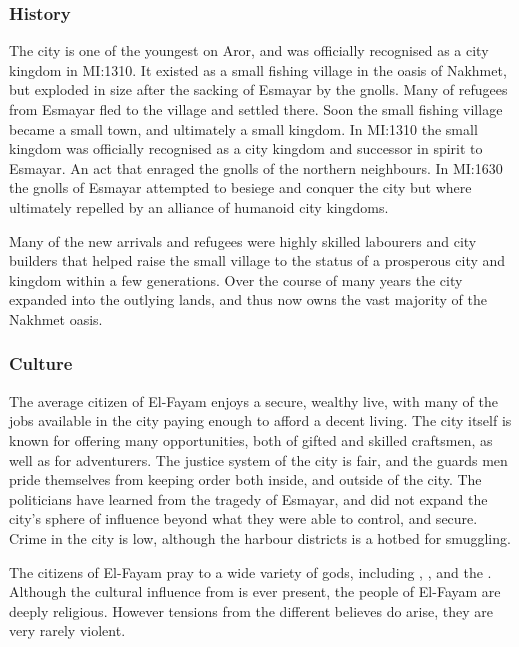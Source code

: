 \subsubsection{History}

The city is one of the youngest on Aror, and was officially recognised as a
city kingdom in MI:1310. It existed as a small fishing village in the oasis of
Nakhmet, but exploded in size after the sacking of Esmayar by the gnolls. Many
of refugees from Esmayar fled to the village and settled there. Soon the small
fishing village became a small town, and ultimately a small kingdom. In
MI:1310 the small kingdom was officially recognised as a city kingdom and
successor in spirit to Esmayar. An act that enraged the gnolls of the northern
neighbours. In MI:1630 the gnolls of Esmayar attempted to besiege and conquer
the city but where ultimately repelled by an alliance of humanoid city
kingdoms.

Many of the new arrivals and refugees were highly skilled labourers and city
builders that helped raise the small village to the status of a prosperous
city and kingdom within a few generations. Over the course of many years the
city expanded into the outlying lands, and thus now owns the vast majority of
the Nakhmet oasis.

\subsubsection{Culture}

The average citizen of El-Fayam enjoys a secure, wealthy live, with many of
the jobs available in the city paying enough to afford a decent living. The
city itself is known for offering many opportunities, both of gifted and skilled
craftsmen, as well as for adventurers. The justice system of the city is fair,
and the guards men pride themselves from keeping order both inside, and outside
of the city. The politicians have learned from the tragedy of Esmayar, and did
not expand the city's sphere of influence beyond what they were able to control,
and secure. Crime in the city is low, although the harbour districts is a hotbed
for smuggling.

The citizens of El-Fayam pray to a wide variety of gods, including
, ,  and the
. Although the cultural influence from  is ever present, the people of El-Fayam are deeply
religious. However tensions from the different believes do arise, they are
very rarely violent.

